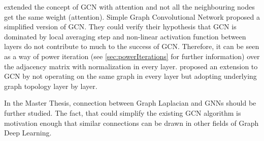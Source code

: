 \citet{GAT} extended the concept of GCN with attention and not all the neighbouring nodes get the same weight (attention).
Simple Graph Convolutional Network \cite{simpleGCN} proposed a simplified version of GCN.
They could verify their hypothesis that GCN is dominated by local averaging step and non-linear 
activation function between layers do not contribute to much to the success of GCN. 
Therefore, it can be seen as a way of power iteration (see \ref{sec:powerIterations} for further information) over the adjacency matrix with normalization in every layer.
\citet{dynamicGCN} proposed an extension to GCN by not operating on the same graph in every layer but adopting
underlying graph topology layer by layer.

\begin{tcolorbox}[colback=red!5!white,colframe=red!75!black]
    In the Master Thesis, connection between Graph Laplacian and GNNs should be further studied.
    The fact, that \citet{simpleGCN} could simplify the existing GCN algorithm is motivation enough
    that similar connections can be drawn in other fields of Graph Deep Learning.
\end{tcolorbox}

